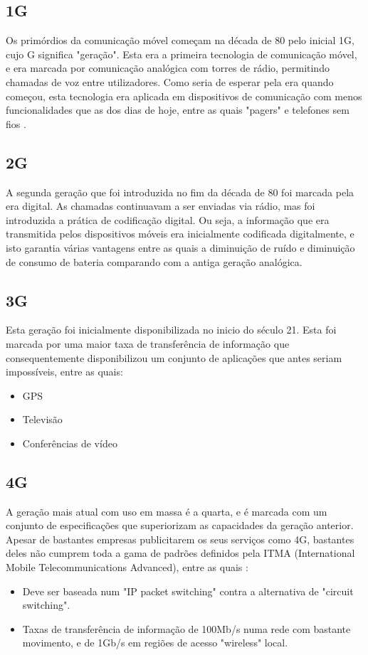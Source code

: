 \documentclass{llncs}
\begin{document}
\subsection{1G}
\hspace*{1.5em}Os primórdios da comunicação móvel começam na década de 80 pelo inicial 1G, cujo G significa "geração". Esta era a primeira tecnologia de comunicação móvel, e era marcada por comunicação analógica com torres de rádio, permitindo chamadas de voz entre utilizadores. Como seria de esperar pela era quando começou, esta tecnologia era aplicada em dispositivos de comunicação com menos funcionalidades que as dos dias de hoje, entre as quais "pagers" e telefones sem fios \cite{Ton:Pan:Kus}.
\subsection{2G}
\hspace*{1.5em}A segunda geração que foi introduzida no fim da década de 80 \cite{Ton:Pan:Kus} foi marcada pela era digital. As chamadas continuavam a ser enviadas via rádio, mas foi introduzida a prática de codificação digital. Ou seja, a informação que era transmitida pelos dispositivos móveis era inicialmente codificada digitalmente, e isto garantia várias vantagens entre as quais a diminuição de ruído e diminuição de consumo de bateria comparando com a antiga geração analógica.
\subsection{3G}
\hspace*{1.5em}Esta geração foi inicialmente disponibilizada no inicio do século 21. Esta foi marcada por uma maior taxa de transferência de informação que consequentemente disponibilizou um conjunto de aplicações que antes seriam impossíveis, entre as quais:
\begin{itemize}
    \item GPS
    \item Televisão
    \item Conferências de vídeo
\end{itemize}
\subsection{4G}
\hspace*{1.5em}A geração mais atual com uso em massa é a quarta, e é marcada com um conjunto de especificações que superiorizam as capacidades da geração anterior. Apesar de bastantes empresas publicitarem os seus serviços como 4G, bastantes deles não cumprem toda a gama de padrões definidos pela ITMA (International Mobile Telecommunications Advanced), entre as quais \cite{standards}:
\begin{itemize}
    \item Deve ser baseada num "IP packet switching" contra a alternativa de "circuit switching".
    \item Taxas de transferência de informação de 100Mb/s numa rede com bastante movimento, e de 1Gb/s em regiões de acesso "wireless" local.
\end{itemize}
\end{document}
